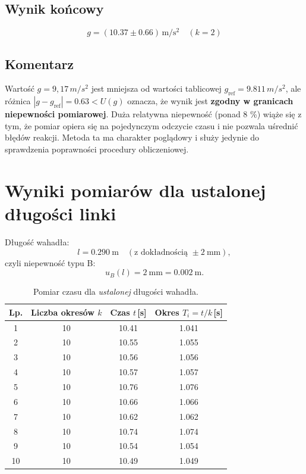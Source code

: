 \documentclass{fizykalab}
\begin{document}
\subsection{Wynik końcowy}

\[
  \boxed{
    g = (10.37 \pm 0.66)\,
    \si{\meter\per\second\squared}\quad(k=2)
  }
\]

\subsection{Komentarz}

Wartość \(g = 9,17\,\si{m/s^2}\) jest mniejsza od wartości tablicowej
\(g_\text{ref} = 9.811\,\si{m/s^2}\), ale różnica \( |g - g_\text{ref}| = 0.63 < U(g)\)
oznacza, że wynik jest \textbf{zgodny w granicach niepewności pomiarowej}.
Duża relatywna niepewność (ponad 8 \%) wiąże się z tym, że pomiar opiera się
na pojedynczym odczycie czasu i nie pozwala uśrednić błędów reakcji.
Metoda ta ma charakter poglądowy i służy jedynie do sprawdzenia poprawności
procedury obliczeniowej.
\pagebreak

\section{Wyniki pomiarów dla ustalonej długości linki}

Długość wahadła:
\[
  l = \SI{0.290}{\meter}
  \quad (\text{z~dokładnością } \pm \SI{2}{\milli\meter}),
\]
czyli niepewność typu B:
\[
  u_B(l) = \SI{2}{\milli\meter} = \SI{0.002}{\meter}.
\]

\begin{table}[H]
  \centering
  \caption{Pomiar czasu dla \emph{ustalonej} długości wahadła.}
  \begin{tabular}{cccc}
    \toprule
    Lp. & Liczba okresów \(k\) & Czas \(t\)\,[\si{\second}] & Okres \(T_i = t/k\)\,[\si{\second}] \\
    \midrule
    1 & 10 & 10.41 & 1.041 \\
    2 & 10 & 10.55 & 1.055 \\
    3 & 10 & 10.56 & 1.056 \\
    4 & 10 & 10.57 & 1.057 \\
    5 & 10 & 10.76 & 1.076 \\
    6 & 10 & 10.66 & 1.066 \\
    7 & 10 & 10.62 & 1.062 \\
    8 & 10 & 10.74 & 1.074 \\
    9 & 10 & 10.54 & 1.054 \\
    10 & 10 & 10.49 & 1.049 \\
    \bottomrule
  \end{tabular}
  \label{tab:wahadlo_fixed}
\end{table}
\end{document}
